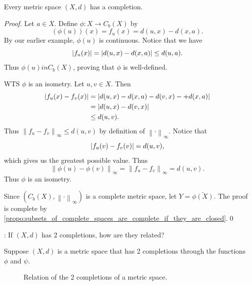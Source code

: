 \documentclass[notoc,notitlepage]{tufte-book}
\newcommand{\norm}[1]{\left\| #1 \right\|}
\begin{document}
\begin{thm}\label{thm:completion_theorem}
  Every metric space $(X, d)$ has a completion.
\end{thm}

\begin{proof}
  Let $a \in X$. Define $\phi : X \to C_b(X)$ by
  \begin{equation*}
    \left( \phi(u) \right)(x) = f_u(x) = d(u, x) - d(x, a).
  \end{equation*}
  By our earlier example, $\phi(u)$ is continuous. Notice that we have
  \begin{equation*}
    \left| f_u(x) \right| = \left| d(u, x) - d(x, a) \right| \leq d(u, a).
  \end{equation*}
  Thus $\phi(u) in C_b(X)$, proving that $\phi$ is well-defined.

  WTS $\phi$ is an isometry. Let $u, v \in X$. Then
  \begin{align*}
    \left| f_u(x) - f_v(x) \right| &= \left| d(u, x) - d(x, a) - d(v, x) - + d(x, a) \right| \\
                            &= \left| d(u, x) - d(v, x) \right| \\
                            &\leq d(u, v).
  \end{align*}
  Thus $\norm{ f_u - f_v }_\infty \leq d(u, v)$ by definition of $\norm\cdot_\infty$. Notice that
  \begin{equation*}
    \left| f_u(v) - f_v(v) \right| = d(u, v),
  \end{equation*}
  which gives us the greatest possible value. Thus
  \begin{equation*}
    \norm{ \phi(u) - \phi(v) }_\infty = \norm{ f_u - f_v }_\infty = d(u, v).
  \end{equation*}
  Thus $\phi$ is an isometry.

  Since $(C_b(X), \norm\cdot_\infty)$ is a complete metric space, let $Y = \bar{\phi(X)}$. The proof is complete by \cref{propo:subsets_of_complete_spaces_are_complete_if_they_are_closed}.\qed\
\end{proof}

: If $(X, d)$ has 2 completions, how are they related?

Suppose $(X, d)$ is a metric space that has 2 completions through the functions $\phi$ and $\psi$.

\begin{figure}[!ht]
  \centering
  \caption{Relation of the 2 completions of a metric space.}
  \label{fig:relation_2_completions_metric_space}
\end{figure}
\end{document}
